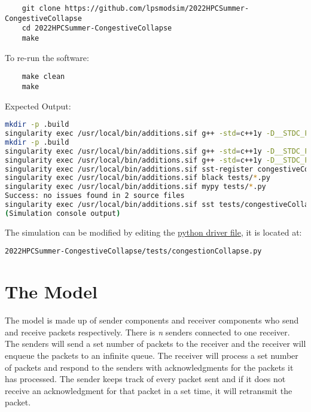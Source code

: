 \documentclass{article}
\begin{document}
\begin{verbatim}
	git clone https://github.com/lpsmodsim/2022HPCSummer-CongestiveCollapse
	cd 2022HPCSummer-CongestiveCollapse
	make
\end{verbatim}

\noindent To re-run the software:

\begin{verbatim}
	make clean
	make
\end{verbatim}

\noindent Expected Output:

\begin{lstlisting}[language=bash, frame=none]
mkdir -p .build
singularity exec /usr/local/bin/additions.sif g++ -std=c++1y -D__STDC_FORMAT_MACROS -fPIC -DHAVE_CONFIG_H -I/opt/SST/11.1.0/include -MMD -c receiver.cc -o .build/receiver.o
mkdir -p .build
singularity exec /usr/local/bin/additions.sif g++ -std=c++1y -D__STDC_FORMAT_MACROS -fPIC -DHAVE_CONFIG_H -I/opt/SST/11.1.0/include -MMD -c sender.cc -o .build/sender.o
singularity exec /usr/local/bin/additions.sif g++ -std=c++1y -D__STDC_FORMAT_MACROS -fPIC -DHAVE_CONFIG_H -I/opt/SST/11.1.0/include -shared -fno-common -Wl,-undefined -Wl,dynamic_lookup -o libcongestiveCollapse.so .build/receiver.o .build/sender.o
singularity exec /usr/local/bin/additions.sif sst-register congestiveCollapse congestiveCollapse_LIBDIR=/home/{USER}/sst-work/2022HPCSummer-CongestiveCollapse
singularity exec /usr/local/bin/additions.sif black tests/*.py
singularity exec /usr/local/bin/additions.sif mypy tests/*.py
Success: no issues found in 2 source files
singularity exec /usr/local/bin/additions.sif sst tests/congestiveCollapse.py
(Simulation console output)
\end{lstlisting}

\noindent The simulation can be modified by editing the \href{http://sst-simulator.org/SSTPages/SSTUserPythonFileFormat/}{python driver file}, it is located at:

\begin{verbatim}
2022HPCSummer-CongestiveCollapse/tests/congestionCollapse.py
\end{verbatim}

\section{The Model}

The model is made up of sender components and receiver components who send and receive packets respectively. There is \textit{n} senders connected to one receiver. The senders will send a set number of packets to the receiver and the receiver will enqueue the packets to an infinite queue. The receiver will process a set number of packets and respond to the senders with acknowledgments for the packets it has processed. The sender keeps track of every packet sent and if it does not receive an acknowledgment for that packet in a set time, it will retransmit the packet.
\end{document}
